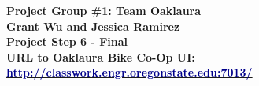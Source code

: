 \documentclass{article}
\begin{document}
\begin{center}
\large\textcolor{primarycolor}{\textbf{Project Group \#1: Team Oaklaura}}\\[0.3cm]
\large\textbf{Grant Wu and Jessica Ramirez}\\[0.3cm]
\huge\textbf{Project Step 6 - Final}\\[0.5cm]

\large\textbf{URL to Oaklaura Bike Co-Op UI:}\\[0.5cm]
\large\href{http://classwork.engr.oregonstate.edu:7013/}{\textcolor{darkblue}{\textbf{http://classwork.engr.oregonstate.edu:7013/}}}\\[1.25cm]
\end{center}
\end{document}
